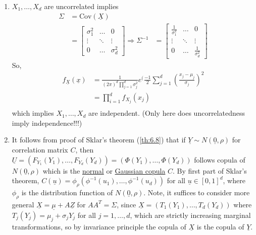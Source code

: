 \documentclass{article}
\newcommand{\inv}{^{-1}}
\newcommand{\Cov}{\mathrm{Cov}}
\begin{document}
\begin{itemize}
\begin{myrem*}{}{}
\begin{enumerate}
								\item $X_1, \dots, X_d$ are uncorrelated implies
								\begin{align*}
									\Sigma&=\Cov(\underline{X})\\
									&=\begin{bmatrix}
										\sigma_1^2 & \dots & 0\\
										\vdots & \ddots & \vdots\\
										0 & \dots & \sigma_d^2
									\end{bmatrix}
									\Rightarrow\Sigma\inv&=\begin{bmatrix}
										\frac{1}{\sigma_1^2} & \dots & 0\\
										\vdots & \ddots & \vdots\\
										0 & \dots & \frac{1}{\sigma_d^2}
									\end{bmatrix}
								\end{align*}
								So,
								\begin{align*}
									f_{\underline{X}}(\underline{x})&=\frac{1}{(2\pi)^d\prod_{j=1}^d\sigma_j^2}e^(\frac{-1}{2}\sum_{j=1}^d(\frac{x_j-\mu_j}{\sigma_j})^2\\
									&=\prod_{i=1}^df_{X_j}(x_j)\\
								\end{align*}
								which implies $X_1, \dots, X_d$ are independent. (Only here does uncorrelatedness imply independence!!!)
								
								\item It follows from proof of Sklar's theorem (\ref{th:6.8}) that if $\underline{Y}\sim N(\underline{0}, \rho)$ for correlation matrix $C$, then $\underline{U}=(F_{Y_1}(Y_1), \dots, F_{Y_d}(Y_d))=(\Phi(Y_1), \dots, \Phi(Y_d))$ follows copula of $N(\underline{0}, \rho)$ which is the \ul{normal} or \ul{Gaussian copula} $C$. By first part of Sklar's theorem, $C(\underline{u})=\phi_{\rho}(\phi\inv(u_1), \dots, \phi\inv(u_d))$ for all $\underline{u}\in[0, 1]^d$, where $\phi_{\rho}$ is the distribution function of $N(\underline{0}, \rho)$. Note, it suffices to consider more general $\underline{X}=\underline{\mu}+A\underline{Z}$ for $AA^T=\Sigma$, since $\underline{X}=(T_1(Y_1), \dots, T_d(Y_d))$ where $T_j(Y_j)=\mu_j+\sigma_jY_j$ for all $j=1, \dots, d$, which are strictly increasing marginal transformations, so by invariance principle the copula of $\underline{X}$ is the copula of $\underline{Y}$.
							\end{enumerate}
						\end{myrem*}
					\end{itemize}
					
\end{document}

